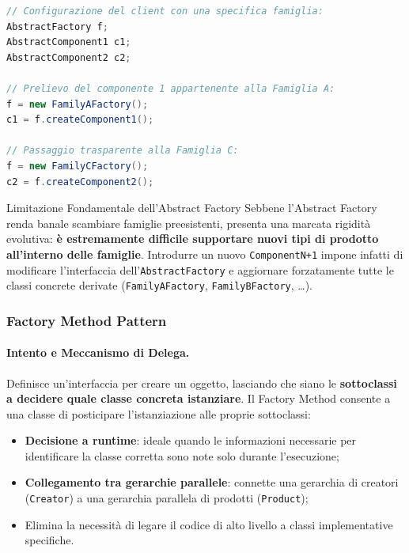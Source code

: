 \documentclass[12pt]{extarticle}
\begin{document}
\begin{lstlisting}[language=Java]
// Configurazione del client con una specifica famiglia:
AbstractFactory f;
AbstractComponent1 c1;
AbstractComponent2 c2;

// Prelievo del componente 1 appartenente alla Famiglia A:
f = new FamilyAFactory();
c1 = f.createComponent1();

// Passaggio trasparente alla Famiglia C:
f = new FamilyCFactory();
c2 = f.createComponent2();
\end{lstlisting}

\begin{cbox}{Limitazione Fondamentale dell'Abstract Factory}
\noindent Sebbene l'Abstract Factory renda banale scambiare famiglie preesistenti, presenta una marcata rigidità evolutiva: \textbf{è estremamente difficile supportare nuovi tipi di prodotto all'interno delle famiglie}.
Introdurre un nuovo \texttt{ComponentN+1} impone infatti di modificare l'interfaccia dell'\texttt{AbstractFactory} e aggiornare forzatamente tutte le classi concrete derivate (\texttt{FamilyAFactory}, \texttt{FamilyBFactory}, \dots).
\end{cbox}

\subsubsection{Factory Method Pattern}
\paragraph{Intento e Meccanismo di Delega.}
Definisce un'interfaccia per creare un oggetto, lasciando che siano le \textbf{sottoclassi a decidere quale classe concreta istanziare}. Il Factory Method consente a una classe di posticipare l'istanziazione alle proprie sottoclassi:
\begin{itemize}
    \item \textbf{Decisione a runtime}: ideale quando le informazioni necessarie per identificare la classe corretta sono note solo durante l'esecuzione;
    \item \textbf{Collegamento tra gerarchie parallele}: connette una gerarchia di creatori (\texttt{Creator}) a una gerarchia parallela di prodotti (\texttt{Product});
    \item Elimina la necessità di legare il codice di alto livello a classi implementative specifiche.
\end{itemize}
\end{document}
